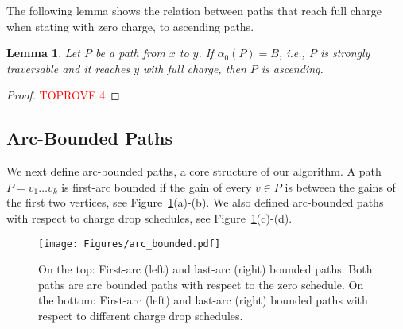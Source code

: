 \documentclass[11pt]{article}
\newtheorem{lemma}[theorem]{Lemma}
\begin{document}
The following lemma shows the relation between paths that reach full charge when stating with zero charge, to ascending paths.

\begin{lemma}\label{lemma:observation-monotone}
    Let $P$ be a path from $x$ to $y$. If $\alpha_0(P) = B$, i.e., $P$ is strongly traversable and it reaches $y$ with full charge, then $P$ is ascending.
\end{lemma}

\begin{proof}\textcolor{red}{TOPROVE 4}\end{proof}

\subsection{Arc-Bounded Paths}

We next define arc-bounded paths, a core structure of our algorithm. A path $P=v_1\ldots v_k$ is first-arc bounded if the gain of every $v\in P$ is between the gains of the first two vertices, see Figure~\ref{fig:bounded_and_funnel_example}(a)-(b). We also defined arc-bounded paths with respect to charge drop schedules, see Figure~\ref{fig:bounded_and_funnel_example}(c)-(d). 

\begin{figure}[t]
    \centering
\texttt{[image: Figures/arc\_bounded.pdf]}
\caption{
On the top: First-arc (left) and last-arc (right) bounded paths. Both paths are arc bounded paths with respect to the zero schedule. 
On the bottom: First-arc (left) and last-arc (right) bounded paths with respect to different charge drop schedules.}
\label{fig:bounded_and_funnel_example}
\end{figure}
\end{document}
